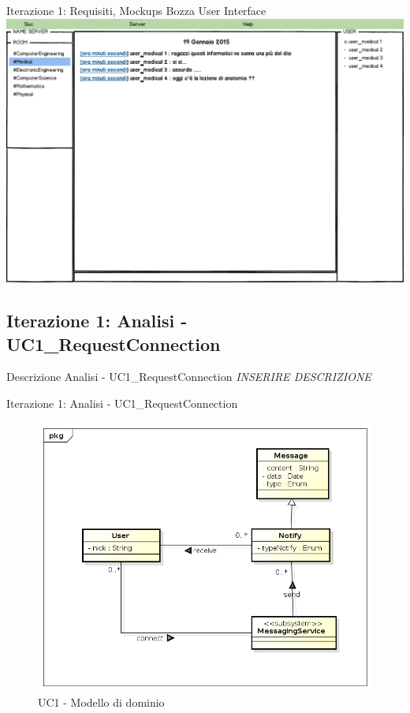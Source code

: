 \documentclass[t]{beamer} %
\begin{document}
\begin{frame} {Iterazione 1: Requisiti, Mockups Bozza User Interface}
    \includegraphics[scale=0.29]{image_mockups/09_snuc_user_room_medical.png}{\centering}
\end{frame}

\subsection{Iterazione 1: Analisi - UC1\_RequestConnection}
\begin{frame} {Descrizione Analisi - UC1\_RequestConnection}
 \emph{INSERIRE DESCRIZIONE}
\end{frame}

\begin{frame} {Iterazione 1: Analisi - UC1\_RequestConnection}
   \begin{figure}
     \includegraphics[scale=0.38]{image_astah/Iteration_1_DomainModel/UC1_RequestConnection_DM.png}{\centering}
     \caption{UC1 - Modello di dominio}
     \label{fig_UC1_RC_DM} 
   \end{figure}
\end{frame}
\end{document}
